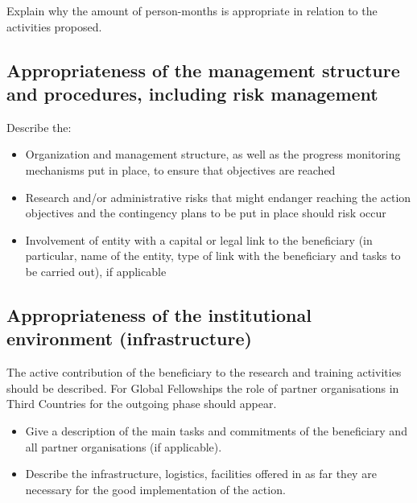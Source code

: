 \medskip\noindent
Explain why the amount of person-months is appropriate in relation to the activities proposed.





\subsection{Appropriateness of the management structure and procedures, including risk management}
\label{sec:implementation_management}

Describe the: 

\begin{itemize}
  \item Organization and management structure, as well as the progress monitoring mechanisms put in place, to ensure that objectives are reached
  \item Research and/or administrative risks that might endanger reaching the action objectives and the contingency plans to be put in place should risk occur  
  \item  Involvement of entity with a capital or legal link to the beneficiary (in particular, name of the entity, type of link with the beneficiary and tasks to be carried out), if applicable
\end{itemize}





\subsection{Appropriateness of the institutional environment (infrastructure)}
\label{sec:implementation_infrastructure}

The active contribution of the beneficiary to the research and training activities should be described. 
For Global Fellowships the role of partner organisations in Third Countries for the outgoing phase should appear. 

\begin{itemize}
  \item Give a description of the main tasks and commitments of the beneficiary and all partner organisations (if applicable).
  \item Describe the infrastructure, logistics, facilities offered in as far they are necessary for the good implementation of the action.
\end{itemize}





\markEndPageLimit
